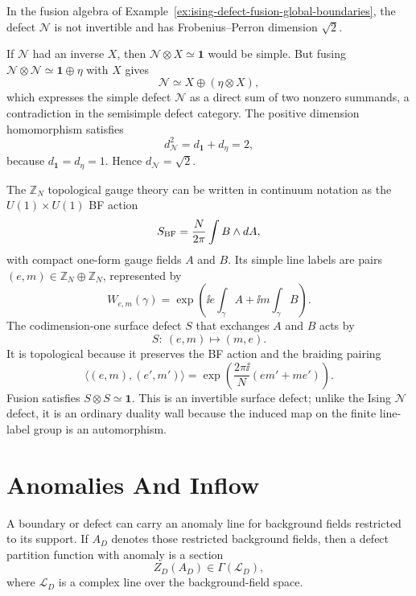 \begin{remark}
\label{rem:ising-defect-noninvertible}
In the fusion algebra of Example~\ref{ex:ising-defect-fusion-global-boundaries},
the defect \(\mathcal N\) is not invertible and has Frobenius--Perron
dimension \(\sqrt2\).

If \(\mathcal N\) had an inverse \(X\), then
\(\mathcal N\otimes X\simeq\mathbf 1\) would be simple.  But fusing
\(\mathcal N\otimes\mathcal N\simeq\mathbf 1\oplus\eta\) with \(X\) gives
\[
  \mathcal N\simeq X\oplus(\eta\otimes X),
\]
which expresses the simple defect \(\mathcal N\) as a direct sum of two
nonzero summands, a contradiction in the semisimple defect category.  The
positive dimension homomorphism satisfies
\[
  d_{\mathcal N}^2=d_{\mathbf 1}+d_\eta=2,
\]
because \(d_{\mathbf 1}=d_\eta=1\).  Hence
\(d_{\mathcal N}=\sqrt2\).
\end{remark}

\begin{example}
\label{ex:three-d-bf-duality-surface}
The \(\mathbb Z_N\) topological gauge theory can be written in continuum
notation as the \(U(1)\times U(1)\) BF action
\[
  S_{\rm BF}
  =
  \frac{N}{2\pi}\int B\wedge dA,
\]
with compact one-form gauge fields \(A\) and \(B\).  Its simple line labels
are pairs \((e,m)\in\mathbb Z_N\oplus\mathbb Z_N\), represented by
\[
  W_{e,m}(\gamma)
  =
  \exp\!\left(\ii e\int_\gamma A+\ii m\int_\gamma B\right).
\]
The codimension-one surface defect \(S\) that exchanges \(A\) and \(B\) acts
by
\[
  S:\ (e,m)\longmapsto(m,e).
\]
It is topological because it preserves the BF action and the braiding pairing
\[
  \langle(e,m),(e',m')\rangle
  =
  \exp\!\left(\frac{2\pi\ii}{N}(em'+me')\right).
\]
Fusion satisfies \(S\otimes S\simeq\mathbf 1\).  This is an invertible
surface defect; unlike the Ising \(\mathcal N\) defect, it is an ordinary
duality wall because the induced map on the finite line-label group is an
automorphism.
\end{example}

\section{Anomalies And Inflow}

\begin{definition}
\label{def:defect-anomaly-line}
A boundary or defect can carry an anomaly line for background fields
restricted to its support.  If \(A_D\) denotes those restricted background
fields, then a defect partition function with anomaly is a section
\[
  Z_D(A_D)\in\Gamma(\mathcal L_D),
\]
where \(\mathcal L_D\) is a complex line over the background-field space.
\end{definition}

